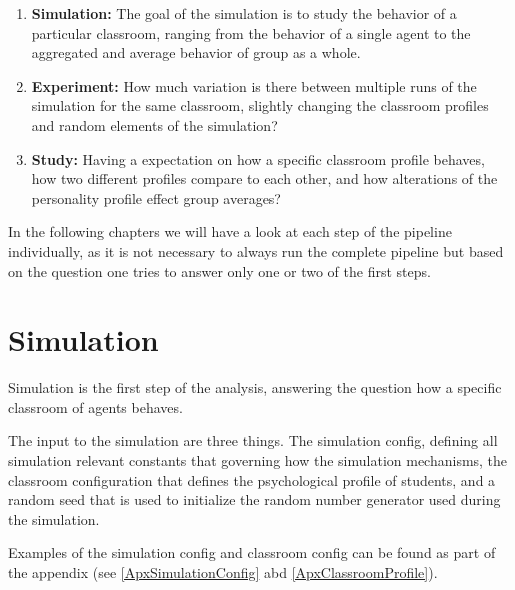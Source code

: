 \begin{enumerate}
    \item \textbf{Simulation:} The goal of the simulation is to study the behavior
    of a particular classroom, ranging from the behavior of a single agent to the
    aggregated and average behavior of group as a whole.
    \item \textbf{Experiment:} How much variation is there between multiple runs of
    the simulation for the same classroom, slightly changing the classroom profiles and
    random elements of the simulation?
    \item \textbf{Study:} Having a expectation on how a specific classroom profile
    behaves, how two different profiles compare to each other, and how alterations
    of the personality profile effect group averages?
\end{enumerate}

In the following chapters we will have a look at each step of the pipeline individually,
as it is not necessary to always run the complete pipeline but based on the question
one tries to answer only one or two of the first steps.

\section{Simulation}
\begin{figure}[!h]
    \hspace*{-2.0\leftmargin}
\end{figure}

Simulation is the first step of the analysis, answering the question how a specific
classroom of agents behaves.

The input to the simulation are three things. The simulation config, defining
all simulation relevant constants that governing how the simulation mechanisms,
the classroom configuration that defines the psychological profile of students,
and a random seed that is used to initialize the random number generator used during
the simulation.

Examples of the simulation config and classroom config can be found as part of
the appendix (see \ref{ApxSimulationConfig} abd \ref{ApxClassroomProfile}).

